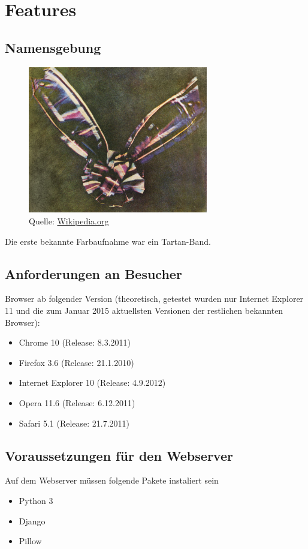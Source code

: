 \chapter{Features}

\section{Namensgebung}
\begin{figure}[h]
  \centering
  \includegraphics[width=0.7\textwidth]{images/tartan_band.jpg}
  \caption{Quelle: \url{Wikipedia.org}}
\end{figure}
Die erste bekannte Farbaufnahme war ein Tartan-Band.

\section{Anforderungen an Besucher}\label{besAnforderungen}
Browser ab folgender Version (theoretisch, getestet wurden nur Internet Explorer 11 und die zum Januar 2015 aktuellsten Versionen der restlichen bekannten Browser):
\begin{itemize}
	\item Chrome 10 (Release: 8.3.2011)
	\item Firefox 3.6 (Release: 21.1.2010)
	\item Internet Explorer 10 (Release: 4.9.2012)
	\item Opera 11.6 (Release: 6.12.2011)
	\item Safari 5.1 (Release: 21.7.2011)
\end{itemize}

\section{Voraussetzungen für den Webserver}
Auf dem Webserver müssen folgende Pakete instaliert sein
\begin{itemize}
	\item Python 3
	\item Django
	\item Pillow
\end{itemize}